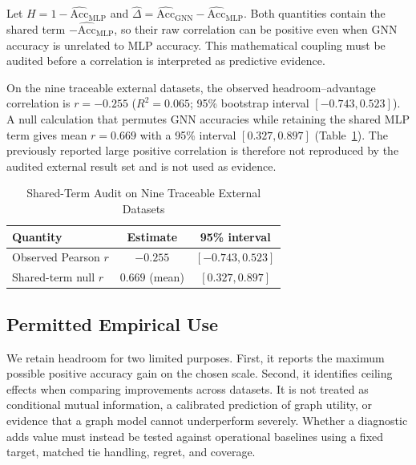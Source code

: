 Let $H=1-\widehat{\mathrm{Acc}}_{\mathrm{MLP}}$ and $\widehat{\Delta}=\widehat{\mathrm{Acc}}_{\mathrm{GNN}}-\widehat{\mathrm{Acc}}_{\mathrm{MLP}}$. Both quantities contain the shared term $-\widehat{\mathrm{Acc}}_{\mathrm{MLP}}$, so their raw correlation can be positive even when GNN accuracy is unrelated to MLP accuracy. This mathematical coupling must be audited before a correlation is interpreted as predictive evidence.

On the nine traceable external datasets, the observed headroom--advantage correlation is $r=-0.255$ ($R^2=0.065$; 95\% bootstrap interval $[-0.743,0.523]$). A null calculation that permutes GNN accuracies while retaining the shared MLP term gives mean $r=0.669$ with a 95\% interval $[0.327,0.897]$ (Table~\ref{tab:predictive_comparison}). The previously reported large positive correlation is therefore not reproduced by the audited external result set and is not used as evidence.

\begin{table}[t]
\centering
\caption{Shared-Term Audit on Nine Traceable External Datasets}
\label{tab:predictive_comparison}
\begin{tabular}{@{}lcc@{}}
\toprule
Quantity & Estimate & 95\% interval \\
\midrule
Observed Pearson $r$ & $-0.255$ & $[-0.743,0.523]$ \\
Shared-term null $r$ & $0.669$ (mean) & $[0.327,0.897]$ \\
\bottomrule
\end{tabular}
\end{table}

\subsection{Permitted Empirical Use}

We retain headroom for two limited purposes. First, it reports the maximum possible positive accuracy gain on the chosen scale. Second, it identifies ceiling effects when comparing improvements across datasets. It is not treated as conditional mutual information, a calibrated prediction of graph utility, or evidence that a graph model cannot underperform severely. Whether a diagnostic adds value must instead be tested against operational baselines using a fixed target, matched tie handling, regret, and coverage.
